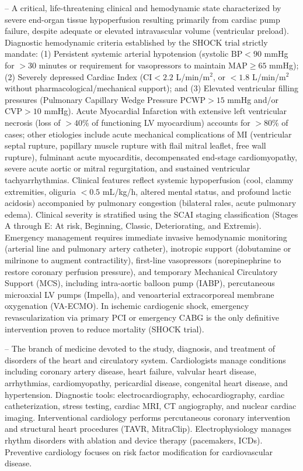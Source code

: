 -- A critical, life-threatening clinical and hemodynamic state characterized by severe end-organ tissue hypoperfusion resulting primarily from cardiac pump failure, despite adequate or elevated intravascular volume (ventricular preload). Diagnostic hemodynamic criteria established by the SHOCK trial strictly mandate: (1) Persistent systemic arterial hypotension (systolic $\text{BP} < 90$ mmHg for $>30$ minutes or requirement for vasopressors to maintain $\text{MAP} \ge 65$ mmHg); (2) Severely depressed Cardiac Index ($\text{CI} < 2.2$ L/min/m$^2$, or $<1.8$ L/min/m$^2$ without pharmacological/mechanical support); and (3) Elevated ventricular filling pressures (Pulmonary Capillary Wedge Pressure $\text{PCWP} > 15$ mmHg and/or $\text{CVP} > 10$ mmHg). Acute Myocardial Infarction with extensive left ventricular necrosis (loss of $>40\%$ of functioning LV myocardium) accounts for $>80\%$ of cases; other etiologies include acute mechanical complications of MI (ventricular septal rupture, papillary muscle rupture with flail mitral leaflet, free wall rupture), fulminant acute myocarditis, decompensated end-stage cardiomyopathy, severe acute aortic or mitral regurgitation, and sustained ventricular tachyarrhythmias. Clinical features reflect systemic hypoperfusion (cool, clammy extremities, oliguria $<0.5$ mL/kg/h, altered mental status, and profound lactic acidosis) accompanied by pulmonary congestion (bilateral rales, acute pulmonary edema). Clinical severity is stratified using the SCAI staging classification (Stages A through E: At risk, Beginning, Classic, Deteriorating, and Extremis). Emergency management requires immediate invasive hemodynamic monitoring (arterial line and pulmonary artery catheter), inotropic support (dobutamine or milrinone to augment contractility), first-line vasopressors (norepinephrine to restore coronary perfusion pressure), and temporary Mechanical Circulatory Support (MCS), including intra-aortic balloon pump (IABP), percutaneous microaxial LV pumps (Impella), and venoarterial extracorporeal membrane oxygenation (VA-ECMO). In ischemic cardiogenic shock, emergency revascularization via primary PCI or emergency CABG is the only definitive intervention proven to reduce mortality (SHOCK trial).

-- The branch of medicine devoted to the study, diagnosis, and treatment of disorders of the heart and circulatory system. Cardiologists manage conditions including coronary artery disease, heart failure, valvular heart disease, arrhythmias, cardiomyopathy, pericardial disease, congenital heart disease, and hypertension. Diagnostic tools: electrocardiography, echocardiography, cardiac catheterization, stress testing, cardiac MRI, CT angiography, and nuclear cardiac imaging. Interventional cardiology performs percutaneous coronary intervention and structural heart procedures (TAVR, MitraClip). Electrophysiology manages rhythm disorders with ablation and device therapy (pacemakers, ICDs). Preventive cardiology focuses on risk factor modification for cardiovascular disease.

